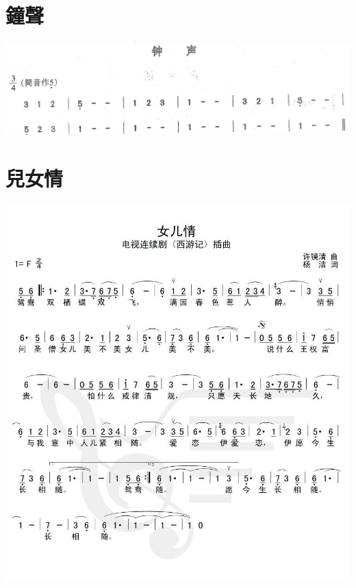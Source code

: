 \documentclass[cn,pad,twocol]{elegantbook}
\begin{document}
\section{鐘聲}                  \includegraphics[width=\textwidth]{dongxiao/20200711-钟声.jpg}
\section{兒女情}                \includegraphics[width=\textwidth]{dongxiao/西游记-儿女情}  
\end{document}
